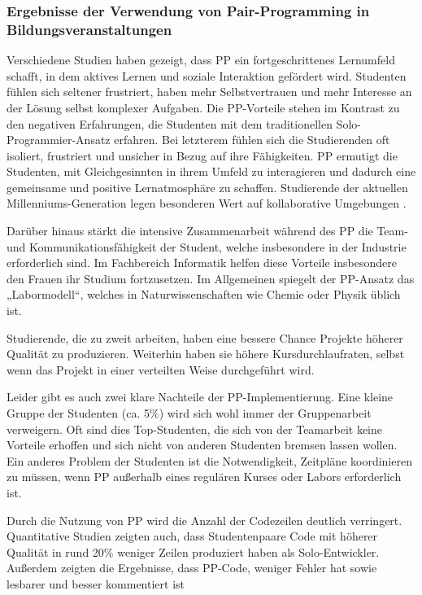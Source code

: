 \subsubsection{ Ergebnisse der Verwendung von Pair-Programming in Bildungsveranstaltungen} Verschiedene Studien \cite{Layman2005HowCourse, Layman2006ChangingDevelopment, Nagappan2003ImprovingProgramming} haben gezeigt, dass PP ein fortgeschrittenes Lernumfeld schafft, in dem aktives Lernen und soziale Interaktion gefördert wird. Studenten fühlen sich seltener frustriert, haben mehr Selbstvertrauen und mehr Interesse an der Lösung selbst komplexer Aufgaben. Die PP-Vorteile stehen im Kontrast zu den negativen Erfahrungen, die Studenten mit dem traditionellen Solo-Programmier-Ansatz erfahren. Bei letzterem fühlen sich die Studierenden oft isoliert, frustriert und unsicher in Bezug auf ihre Fähigkeiten. PP ermutigt die Studenten, mit Gleichgesinnten in ihrem Umfeld zu interagieren und dadurch eine gemeinsame und positive Lernatmosphäre zu schaffen. Studierende der aktuellen Millenniums-Generation legen besonderen Wert auf kollaborative Umgebungen \cite{Williams2010PairProgramming}.


Darüber hinaus stärkt die intensive Zusammenarbeit während des PP die Team- und Kommunikationsfähigkeit der Student, welche insbesondere in der Industrie erforderlich sind. Im Fachbereich Informatik helfen diese Vorteile insbesondere den Frauen ihr Studium fortzusetzen. Im Allgemeinen spiegelt der PP-Ansatz das „Labormodell“, welches in Naturwissenschaften wie Chemie oder Physik üblich ist.


Studierende, die zu zweit arbeiten, haben eine bessere Chance Projekte höherer Qualität zu produzieren. Weiterhin haben sie höhere Kursdurchlaufraten, selbst wenn das Projekt in einer verteilten Weise durchgeführt wird.


Leider gibt es auch zwei klare Nachteile der PP-Implementierung. Eine kleine Gruppe der Studenten (ca. 5\%) wird sich wohl immer der Gruppenarbeit verweigern. Oft sind dies Top-Studenten, die sich von der Teamarbeit keine Vorteile erhoffen und sich nicht von anderen Studenten bremsen lassen wollen. Ein anderes Problem der Studenten ist die Notwendigkeit, Zeitpläne koordinieren zu müssen, wenn PP außerhalb eines regulären Kurses oder Labors erforderlich ist\cite{Williams2010PairProgramming}.


Durch die Nutzung von PP wird die Anzahl der Codezeilen deutlich verringert. Quantitative Studien zeigten auch, dass Studentenpaare Code mit höherer Qualität in rund 20\% weniger Zeilen produziert haben als Solo-Entwickler. Außerdem zeigten die Ergebnisse, dass PP-Code, weniger Fehler hat sowie lesbarer und besser kommentiert ist \cite{Cockburn2001TheProgramming}

